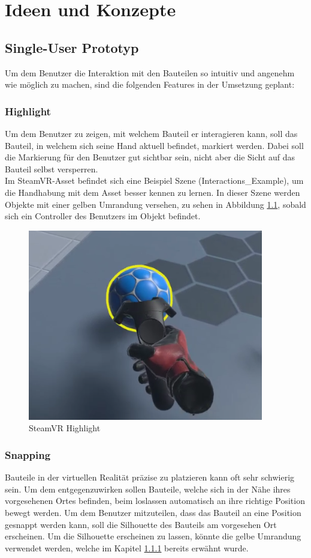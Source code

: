 \chapter{Ideen und Konzepte}
\label{ch:Ideen_und_Konzepte}

\section{Single-User Prototyp}
Um dem Benutzer die Interaktion mit den Bauteilen so intuitiv und angenehm wie möglich zu machen, sind die folgenden Features in der Umsetzung geplant:

\subsection{Highlight}
\label{ch:highlight}
Um dem Benutzer zu zeigen, mit welchem Bauteil er interagieren kann, soll das Bauteil, in welchem sich seine Hand aktuell befindet, markiert werden. Dabei soll die Markierung für den Benutzer gut sichtbar sein, nicht aber die Sicht auf das Bauteil selbst versperren. \\
Im SteamVR-Asset befindet sich eine Beispiel Szene (Interactions\_Example), um die Handhabung mit dem Asset besser kennen zu lernen. In dieser Szene werden Objekte mit einer gelben Umrandung versehen, zu sehen in Abbildung \ref{fig:steamvr_highlight}, sobald sich ein Controller des Benutzers im Objekt befindet.

\begin{figure}[h!]
	\centering
	\includegraphics[keepaspectratio,width=0.4\linewidth]{img/SteamVR_Highlight.PNG}
	\caption{SteamVR Highlight}
	\label{fig:steamvr_highlight}
\end{figure}
	
\subsection{Snapping}
Bauteile in der virtuellen Realität präzise zu platzieren kann oft sehr schwierig sein. Um dem entgegenzuwirken sollen Bauteile, welche sich in der Nähe ihres vorgesehenen Ortes befinden, beim loslassen automatisch an ihre richtige Position bewegt werden. Um dem Benutzer mitzuteilen, dass das Bauteil an eine Position \grqq gesnappt\grqq{} werden kann, soll die Silhouette des Bauteils am vorgesehen Ort erscheinen. Um die Silhouette erscheinen zu lassen, könnte die gelbe Umrandung verwendet werden, welche im Kapitel \ref{ch:highlight} bereits erwähnt wurde. 
	
